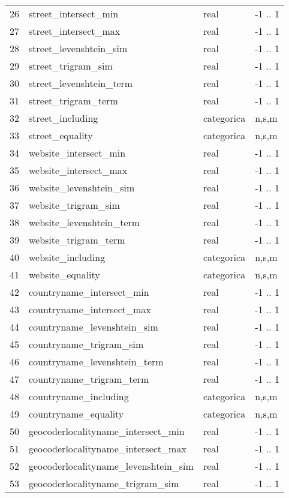\documentclass[journal]{IEEEtran}
\begin{document}
\begin{table}[ht!]
\begin{tabular}{l | l l l}
26	& street\_intersect\_min  &   real & -1 .. 1  \\
27	& street\_intersect\_max  &   real & -1 .. 1  \\
28	& street\_levenshtein\_sim  &   real & -1 .. 1  \\
29	& street\_trigram\_sim  &   real & -1 .. 1  \\
30	& street\_levenshtein\_term  &   real & -1 .. 1  \\
31	& street\_trigram\_term  &   real & -1 .. 1  \\
32	& street\_including  &    categorica &  n,s,m  \\
33	& street\_equality  &    categorica &  n,s,m  \\
34	& website\_intersect\_min  &   real & -1 .. 1  \\
35	& website\_intersect\_max  &   real & -1 .. 1  \\
36	& website\_levenshtein\_sim  &   real & -1 .. 1  \\
37	& website\_trigram\_sim  &   real & -1 .. 1  \\
38	& website\_levenshtein\_term  &   real & -1 .. 1  \\
39	& website\_trigram\_term  &   real & -1 .. 1  \\
40	& website\_including  &    categorica &  n,s,m  \\
41	& website\_equality  &    categorica &  n,s,m  \\
42	& countryname\_intersect\_min  &   real & -1 .. 1  \\
43	& countryname\_intersect\_max  &   real & -1 .. 1  \\
44	& countryname\_levenshtein\_sim  &   real & -1 .. 1  \\
45	& countryname\_trigram\_sim  &   real & -1 .. 1  \\
46	& countryname\_levenshtein\_term  &   real & -1 .. 1  \\
47	& countryname\_trigram\_term  &   real & -1 .. 1  \\
48	& countryname\_including  &    categorica &  n,s,m  \\
49	& countryname\_equality  &    categorica &  n,s,m  \\
50	& geocoderlocalityname\_intersect\_min  &   real & -1 .. 1  \\
51	& geocoderlocalityname\_intersect\_max  &   real & -1 .. 1  \\
52	& geocoderlocalityname\_levenshtein\_sim  &   real & -1 .. 1  \\
53	& geocoderlocalityname\_trigram\_sim  &   real & -1 .. 1  \\

\end{tabular}
\end{table}
\end{document}
